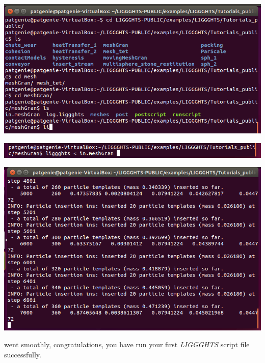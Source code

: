 \documentclass{tufte-book} %
\newcommand{\Li}{\textit{LIGGGHTS}\xspace}
\begin{document}
 \begin{marginfigure}
   \includegraphics[width=\linewidth]{graphics/Screenshot/Lig10.png}
   \caption{Type li into the shell prompt and hit}
 \end{marginfigure}
  \begin{marginfigure}
   \includegraphics[width=\linewidth]{graphics/Screenshot/Lig11.png}
   \caption{Type liggghts < in.meshGran}
 \end{marginfigure}
  \begin{marginfigure}
   \includegraphics[width=\linewidth]{graphics/Screenshot/Lig12.png}
   \caption{\Li should begin executing the file}
 \end{marginfigure}
  went smoothly, congratulations, you have run your first \Li script file successfully.
\end{document}
